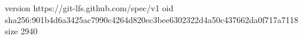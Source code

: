version https://git-lfs.github.com/spec/v1
oid sha256:901b4d6a3425ac7990c4264d820ec3bee6302322d4a50c437662da0f717a7118
size 2940
